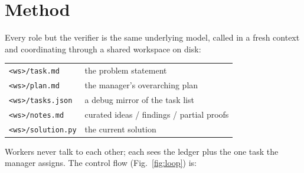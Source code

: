 \documentclass[journal]{IEEEtran}
\begin{document}
\section{Method}
\label{sec:method}

Every role but the verifier is the same underlying model, called in a fresh context and
coordinating through a shared workspace on disk:

\begin{center}
\small
\begin{tabular}{@{}ll@{}}
\texttt{<ws>/task.md}     & the problem statement \\
\texttt{<ws>/plan.md}     & the manager's overarching plan \\
\texttt{<ws>/tasks.json}  & a debug mirror of the task list \\
\texttt{<ws>/notes.md}    & curated ideas / findings / partial proofs \\
\texttt{<ws>/solution.py} & the current solution \\
\end{tabular}
\end{center}

Workers never talk to each other; each sees the ledger plus the one task the manager
assigns. The control flow (Fig.~\ref{fig:loop}) is:
\end{document}
